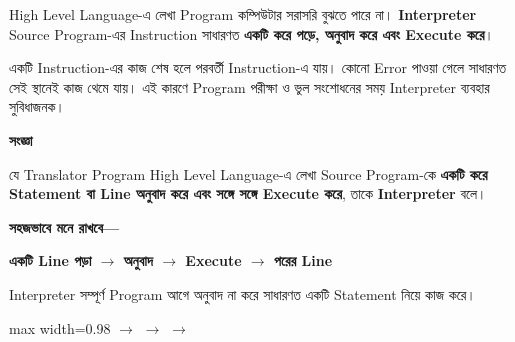 
High Level Language-এ লেখা Program কম্পিউটার সরাসরি বুঝতে পারে না।
\textbf{Interpreter} Source Program-এর Instruction সাধারণত
\textbf{একটি করে পড়ে, অনুবাদ করে এবং Execute করে}।

একটি Instruction-এর কাজ শেষ হলে পরবর্তী Instruction-এ যায়।
কোনো Error পাওয়া গেলে সাধারণত সেই স্থানেই কাজ থেমে যায়।
এই কারণে Program পরীক্ষা ও ভুল সংশোধনের সময় Interpreter
ব্যবহার সুবিধাজনক।


\begin{definitionbox}

\textbf{\color{darkTeal}সংজ্ঞা}

যে Translator Program High Level Language-এ লেখা Source Program-কে
\textbf{একটি করে Statement বা Line অনুবাদ করে এবং সঙ্গে সঙ্গে
Execute করে}, তাকে \textbf{Interpreter} বলে।

\end{definitionbox}

\textbf{সহজভাবে মনে রাখবে—}

\begin{center}

\textbf{
একটি Line পড়া
\(\longrightarrow\)
অনুবাদ
\(\longrightarrow\)
Execute
\(\longrightarrow\)
পরের Line
}

\end{center}


Interpreter সম্পূর্ণ Program আগে অনুবাদ না করে সাধারণত
একটি Statement নিয়ে কাজ করে।

\begin{center}
\begin{adjustbox}{max width=0.98\linewidth}
\quad
\(\longrightarrow\)
\quad
{}
\quad
\(\longrightarrow\)
\quad
{}
\quad
\(\longrightarrow\)
\quad
{}
\end{adjustbox}
\end{center}

